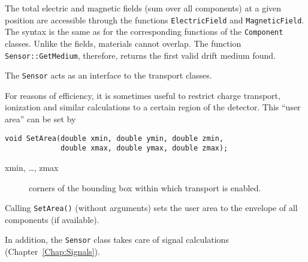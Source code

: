 The total electric and magnetic fields 
(sum over all components) at a given position are accessible through 
the functions \texttt{ElectricField} and \texttt{MagneticField}.
The syntax is the same as for the corresponding functions of the 
\texttt{Component} classes.
Unlike the fields, materials cannot overlap. 
The function \texttt{Sensor::GetMedium}, therefore, 
returns the first valid drift medium found. 
 
The \texttt{Sensor} acts as an interface to the transport classes.

For reasons of efficiency, it is sometimes useful to restrict 
charge transport, ionization and similar calculations to a 
certain region of the detector.
This ``user area'' can be set by
\begin{lstlisting}
void SetArea(double xmin, double ymin, double zmin,
             double xmax, double ymax, double zmax);
\end{lstlisting} 
\begin{description}
\item[xmin, \dots, zmax]
corners of the bounding box within which transport is enabled. 
\end{description}
Calling \texttt{SetArea()} (without arguments) sets the 
user area to the envelope of all components (if available).

In addition, the \texttt{Sensor} class takes care of 
signal calculations (Chapter~\ref{Chap:Signals}).

